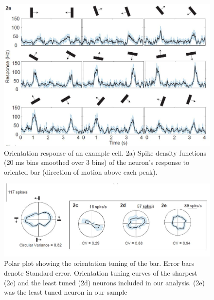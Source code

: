 			\begin{figure}
				
				\includegraphics[width=\linewidth]{SCOriResp.jpg}
				\caption{Orientation response of an example cell.
					2a) Spike density functions (20 ms bins smoothed over
					3 bins) of the neuron’s response to oriented bar (direction
					of motion above each peak).}
				\label{fig:fig2}
			\end{figure}
			
		
			\begin{figure}
				\includegraphics[width=\linewidth]{SCOriTuning.jpg}
				\caption{Polar plot showing
					the orientation tuning of the bar. Error bars denote
					Standard error. Orientation tuning curves of the
					sharpest (2c) and the least tuned (2d) neurons
					included in our analysis. (2e) was the least tuned
					neuron in our sample}
				\label{fig:fig3}			
			\end{figure}
		
